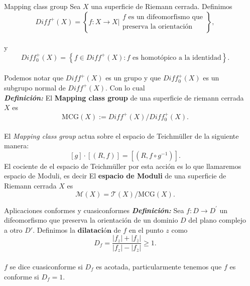 \documentclass[final]{beamer}
\newlength{\sepwidth}
\newlength{\colwidth}
\newcommand{\separatorcolumn}{\begin{column}{\sepwidth}\end{column}}
\newcommand{\defi}[1]{\textbf{\emph{#1}}}
\begin{document}
\begin{frame}[t,fragile]
\begin{columns}[t]
\begin{column}{\colwidth}
\begin{alertblock}{Mapping class group} 
Sea $X$ una superficie de Riemann cerrada. Definimos\\
       $$Diff^+(X)=\left\{f:X\to X| \begin{array}{c}f \text{ es un difeomorfismo que}\\ \text{preserva la orientación }\end{array}\right\},$$\\
        y
        $$Diff^+_0(X)=\left\{f\in Diff^+(X):f\text{ es homotópico a la identidad}\right\}.$$\\
        Podemos notar que $Diff^+(X)$ es un grupo y que $Diff^+_0(X)$ es un subgrupo normal de $Diff^+(X).$ Con lo cual\\
        \vspace{0.2cm} 
        \defi{Definición: }El \textbf{Mapping class group} de una superficie de riemann cerrada $X$ es
            $$\text{MCG}(X):=Diff^+(X)/Diff^+_0(X).$$\\ 
        \vspace{0.2cm}
        El \textit{Mapping class group} actua sobre el espacio de Teichmüller de la siguiente manera:
        $$[g]\cdot[(R,f)]=[(R,f\circ g^{-1})].$$
        El cociente de el espacio de Teichmüller por esta acción es lo que llamaremos espacio de Moduli, es decir
            El \textbf{espacio de Moduli} de una superficie de Riemann cerrada $X$ es
            $$\mathcal{M}(X)=\mathcal{T}(X)/\text{MCG}(X).$$
    
\end{alertblock}

\begin{block}{Aplicaciones conformes y cuasiconformes}
    \defi{Definición: } Sea $f: D \rightarrow D^{\prime}$ un difeomorfismo que preserva la orientación de un dominio $D$ del plano complejo a otro $D'$. Definimos la $\textbf{dilatación}$ de $f$ en el punto $z$ como 
    $$D_f=\frac{|f_z|+|f_{\overline{z}}|}{|f_z|-|f_{\overline{z}}|}\geq 1.$$\\ 

    $f$ se dice cuasiconforme si $D_f$ es acotada, particularmente tenemos que $f$ es conforme si $D_f=1$. 
\end{block}


\end{column}

\separatorcolumn


\end{columns}
\end{frame}
\end{document}

